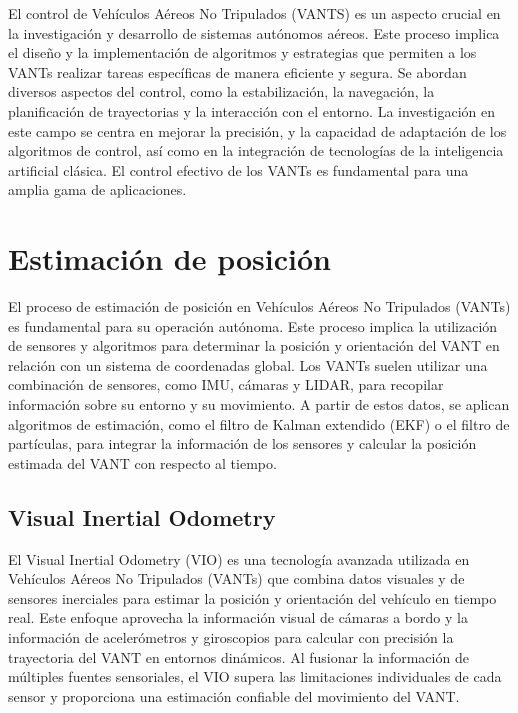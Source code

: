El control de Vehículos Aéreos No Tripulados (VANTS) es un aspecto crucial en la investigación y desarrollo de sistemas autónomos aéreos. Este proceso implica el diseño y la implementación de algoritmos y estrategias que permiten a los VANTs realizar tareas específicas de manera eficiente y segura. Se abordan diversos aspectos del control, como la estabilización, la navegación, la planificación de trayectorias y la interacción con el entorno. La investigación en este campo se centra en mejorar la precisión, y la capacidad de adaptación de los algoritmos de control, así como en la integración de tecnologías de la inteligencia artificial clásica. El control efectivo de los VANTs es fundamental para una amplia gama de aplicaciones.

\section{Estimación de posición}

El proceso de estimación de posición en Vehículos Aéreos No Tripulados (VANTs) es fundamental para su operación autónoma. Este proceso implica la utilización de sensores y algoritmos para determinar la posición y orientación del VANT en relación con un sistema de coordenadas global. Los VANTs suelen utilizar una combinación de sensores, como IMU, cámaras y LIDAR, para recopilar información sobre su entorno y su movimiento. A partir de estos datos, se aplican algoritmos de estimación, como el filtro de Kalman extendido (EKF) o el filtro de partículas, para integrar la información de los sensores y calcular la posición estimada del VANT con respecto al tiempo.

\subsection{Visual Inertial Odometry}

El Visual Inertial Odometry (VIO) es una tecnología avanzada utilizada en Vehículos Aéreos No Tripulados (VANTs) que combina datos visuales y de sensores inerciales para estimar la posición y orientación del vehículo en tiempo real. Este enfoque aprovecha la información visual de cámaras a bordo y la información de acelerómetros y giroscopios para calcular con precisión la trayectoria del VANT en entornos dinámicos. Al fusionar la información de múltiples fuentes sensoriales, el VIO supera las limitaciones individuales de cada sensor y proporciona una estimación confiable del movimiento del VANT.

